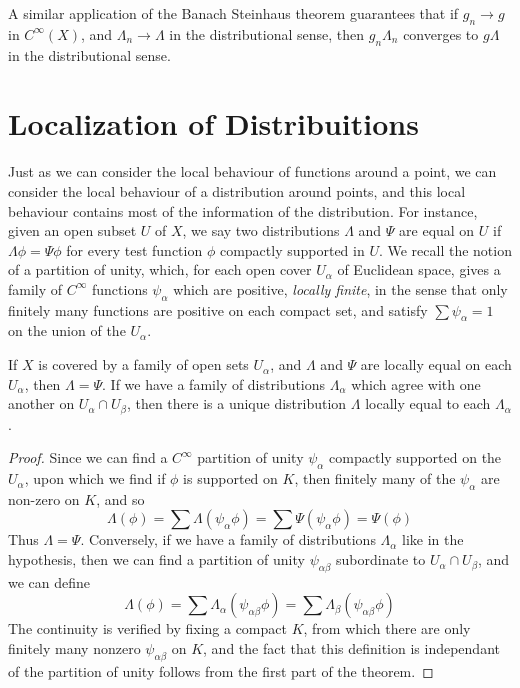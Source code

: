 A similar application of the Banach Steinhaus theorem guarantees that if $g_n \to g$ in $C^\infty(X)$, and $\Lambda_n \to \Lambda$ in the distributional sense, then $g_n \Lambda_n$ converges to $g \Lambda$ in the distributional sense.

\section{Localization of Distribuitions}

Just as we can consider the local behaviour of functions around a point, we can consider the local behaviour of a distribution around points, and this local behaviour contains most of the information of the distribution. For instance, given an open subset $U$ of $X$, we say two distributions $\Lambda$ and $\Psi$ are equal on $U$ if $\Lambda \phi = \Psi \phi$ for every test function $\phi$ compactly supported in $U$. We recall the notion of a partition of unity, which, for each open cover $U_\alpha$ of Euclidean space, gives a family of $C^\infty$ functions $\psi_\alpha$ which are positive, {\it locally finite}, in the sense that only finitely many functions are positive on each compact set, and satisfy $\sum \psi_\alpha = 1$ on the union of the $U_\alpha$.

\begin{theorem}
    If $X$ is covered by a family of open sets $U_\alpha$, and $\Lambda$ and $\Psi$ are locally equal on each $U_\alpha$, then $\Lambda = \Psi$. If we have a family of distributions $\Lambda_\alpha$ which agree with one another on $U_\alpha \cap U_\beta$, then there is a unique distribution $\Lambda$ locally equal to each $\Lambda_\alpha$.
\end{theorem}
\begin{proof}
    Since we can find a $C^\infty$ partition of unity $\psi_\alpha$ compactly supported on the $U_\alpha$, upon which we find if $\phi$ is supported on $K$, then finitely many of the $\psi_\alpha$ are non-zero on $K$, and so
    \[ \Lambda(\phi) = \sum \Lambda(\psi_\alpha \phi) = \sum \Psi(\psi_\alpha \phi) = \Psi(\phi) \]
    Thus $\Lambda = \Psi$. Conversely, if we have a family of distributions $\Lambda_\alpha$ like in the hypothesis, then we can find a partition of unity $\psi_{\alpha \beta}$ subordinate to $U_\alpha \cap U_\beta$, and we can define
    \[ \Lambda(\phi) = \sum \Lambda_\alpha(\psi_{\alpha \beta} \phi) = \sum \Lambda_\beta(\psi_{\alpha \beta} \phi) \]
    The continuity is verified by fixing a compact $K$, from which there are only finitely many nonzero $\psi_{\alpha \beta}$ on $K$, and the fact that this definition is independant of the partition of unity follows from the first part of the theorem.
\end{proof}

